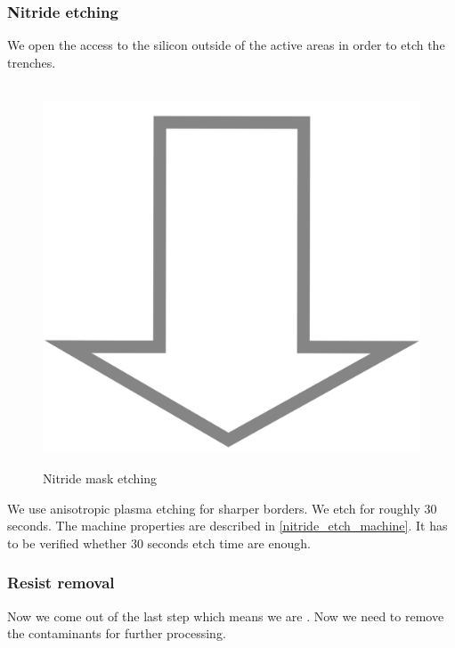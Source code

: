 \subsubsection{Nitride etching}\label{sti_nitride_etch}
We open the access to the silicon outside of the active areas in order to etch the trenches.
\begin{figure}[H]
	\centering
	\begin{tikzpicture}[node distance = 3cm, auto, thick,scale=\CrossSectionOnly, every node/.style={transform shape}]
		
	\end{tikzpicture} \\
	\includegraphics[scale=0.01]{down_arrow.png} \\
	\begin{tikzpicture}[node distance = 3cm, auto, thick,scale=\CrossSectionOnly, every node/.style={transform shape}]
		
	\end{tikzpicture}
	\caption{Nitride mask etching}
\end{figure}
We use anisotropic plasma etching for sharper borders. We etch for roughly 30 seconds. The machine properties are described in \autoref{nitride_etch_machine}.
It has to be verified whether 30 seconds etch time are enough.

\subsubsection{Resist removal}
Now we come out of the last step which means we are \WaferSemiClean. Now we need to remove the contaminants for further processing.

